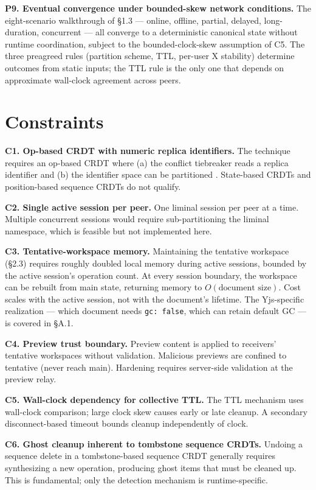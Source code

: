 \textbf{P9. Eventual convergence under bounded-skew network conditions.} The eight-scenario walkthrough of \S1.3 --- online, offline, partial, delayed, long-duration, concurrent --- all converge to a deterministic canonical state without runtime coordination, subject to the bounded-clock-skew assumption of C5. The three preagreed rules (partition scheme, TTL, per-user X stability) determine outcomes from static inputs; the TTL rule is the only one that depends on approximate wall-clock agreement across peers.

\section{Constraints}

\textbf{C1. Op-based CRDT with numeric replica identifiers.} The technique requires an op-based CRDT where (a) the conflict tiebreaker reads a replica identifier and (b) the identifier space can be partitioned \cite{plexus:partitioning}. State-based CRDTs and position-based sequence CRDTs do not qualify.

\textbf{C2. Single active session per peer.} One liminal session per peer at a time. Multiple concurrent sessions would require sub-partitioning the liminal namespace, which is feasible but not implemented here.

\textbf{C3. Tentative-workspace memory.} Maintaining the tentative workspace (\S2.3) requires roughly doubled local memory during active sessions, bounded by the active session's operation count. At every session boundary, the workspace can be rebuilt from main state, returning memory to $O(\text{document size})$. Cost scales with the active session, not with the document's lifetime. The Yjs-specific realization --- which document needs \texttt{gc: false}, which can retain default GC --- is covered in \S A.1.

\textbf{C4. Preview trust boundary.} Preview content is applied to receivers' tentative workspaces without validation. Malicious previews are confined to tentative (never reach main). Hardening requires server-side validation at the preview relay.

\textbf{C5. Wall-clock dependency for collective TTL.} The TTL mechanism uses wall-clock comparison; large clock skew causes early or late cleanup. A secondary disconnect-based timeout bounds cleanup independently of clock.

\textbf{C6. Ghost cleanup inherent to tombstone sequence CRDTs.} Undoing a sequence delete in a tombstone-based sequence CRDT generally requires synthesizing a new operation, producing ghost items that must be cleaned up. This is fundamental; only the detection mechanism is runtime-specific.

